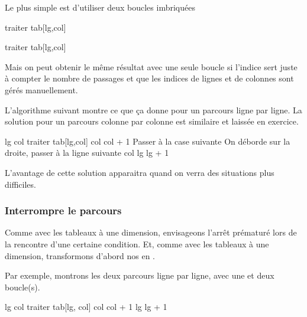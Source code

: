 Le plus simple est d'utiliser deux boucles imbriquées 

\begin{Pseudocode}
			\Stmt traiter tab[lg,col]
		\EndFor
	\EndFor
\end{Pseudocode}

\begin{Pseudocode}
			\Stmt traiter tab[lg,col]
		\EndFor
	\EndFor
\end{Pseudocode}

Mais on peut obtenir le même résultat avec une seule boucle
si l'indice sert juste à compter le nombre de passages
et que les indices de lignes et de colonnes sont gérés manuellement.

L'algorithme suivant montre ce que ça donne
pour un parcours ligne par ligne.
La solution pour un parcours colonne par colonne est similaire
et laissée en exercice.

\begin{Pseudocode}
	\Let lg 
	\Let col 
		\Stmt traiter tab[lg,col]
		\Let col \Gets col + 1	\RComment Passer à la case suivante
		 \RComment On déborde sur la droite, passer à la ligne suivante
			\Let col 
			\Let lg \Gets lg + 1
		\EndIf
	\EndFor
\end{Pseudocode}

L'avantage de cette solution apparaitra 
quand on verra des situations plus difficiles.

\subsubsection*{Interrompre le parcours}

Comme avec les tableaux à une dimension, 
envisageons l'arrêt prématuré lors de la rencontre d'une certaine condition.
Et, comme avec les tableaux à une dimension, 
transformons d'abord nos  en .

Par exemple, montrons les deux parcours ligne par ligne, avec une et deux boucle(s).

\begin{Pseudocode}
	\Let lg 
		\Let col 
			\Stmt traiter tab[lg, col]
			\Let col \Gets col + 1
		\EndWhile
		\Let lg \Gets lg + 1
	\EndWhile
\end{Pseudocode}

